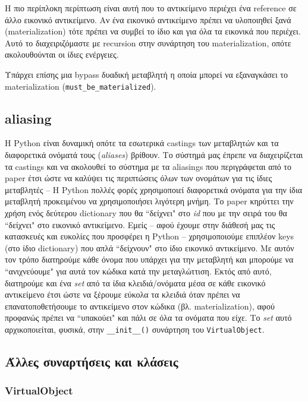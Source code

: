 Η πιο περίπλοκη περίπτωση είναι αυτή που το αντικείμενο περιέχει ένα reference
σε άλλο εικονικό αντικείμενο. Αν ένα εικονικό αντικείμενο πρέπει να υλοποιηθεί
ξανά (materialization) τότε πρέπει να συμβεί το ίδιο και για όλα τα εικονικά που
περιέχει. Αυτό το διαχειριζόμαστε με recursion στην συνάρτηση του
materialization, οπότε ακολουθούνται οι ίδιες ενέργειες.

Υπάρχει επίσης μια bypass δυαδική μεταβλητή η οποία μπορεί να εξαναγκάσει το
materialization (\texttt{must\_be\_materialized}).


\subsection{aliasing}

Η Python είναι δυναμική οπότε τα εσωτερικά castings των μεταβλητών και τα
διαφορετικά ονόματά τους (\textit{aliases}) βρίθουν. Το σύστημά μας έπρεπε να
διαχειρίζεται τα castings και να ακολουθεί το σύστημα με τα aliasings που
περιγράφεται από το paper έτσι ώστε να καλύψει τις περιπτώσεις όλων των
ονομάτων για τις ίδιες μεταβλητές – Η Python πολλές φορές χρησιμοποιεί
διαφορετικά ονόματα για την ίδια μεταβλητή προκειμένου να χρησιμοποιήσει
λιγότερη μνήμη. Το paper κηρύττει την χρήση ενός δεύτερου dictionary που θα
``δείχνει" στο \textit{id} που με την σειρά του θα ``δείχνει" στο εικονικό
αντικείμενο. Εμείς – αφού έχουμε στην διάθεσή μας τις κατασκευές και ευκολίες
που προσφέρει η Python – χρησιμοποιούμε επιπλέον keys (στο ίδιο dictionary)
που απλά ``δείχνουν" στο ίδιο εικονικό αντικείμενο. Με αυτόν τον τρόπο
διατηρούμε κάθε όνομα που υπάρχει για την μεταβλητή και μπορούμε να
``ανιχνεύουμε" για αυτά τον κώδικα κατά την μεταγλώττιση. Εκτός από αυτό,
διατηρούμε και ένα \textit{set} από τα ίδια κλειδιά/ονόματα μέσα σε κάθε
εικονικό αντικείμενο έτσι ώστε να ξέρουμε εύκολα τα κλειδιά όταν πρέπει να
επανατοποθετήσουμε το αντικείμενο στον κώδικα (βλ. materialization), αφού
προφανώς πρέπει να ``υπακούει" και πάλι σε όλα τα ονόματα που είχε. Το
\textit{set} αυτό αρχικοποιείται, φυσικά, στην \texttt{\_\_init\_\_()}
συνάρτηση του \texttt{VirtualObject}.

\subsection{Άλλες συναρτήσεις και κλάσεις}

\subsubsection{VirtualObject}

